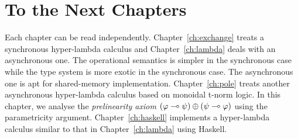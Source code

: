 \section{To the Next Chapters}

Each chapter can be read independently.
Chapter~\ref{ch:exchange} treats a synchronous hyper-lambda calculus and
Chapter~\ref{ch:lambda} deals with an asynchronous one.
The operational semantics is simpler in the synchronous case while
the type system is more exotic in the synchronous case.
The asynchronous one is apt for shared-memory implementation.
Chapter~\ref{ch:pole} treats another asynchronous hyper-lambda calculus
based on monoidal t-norm logic.  In this chapter, we analyse the
\textit{prelinearity
axiom}
$(\varphi\multimap\psi)\oplus(\psi\multimap\varphi)$ using the
parametricity argument.
Chapter~\ref{ch:haskell} implements a hyper-lambda calculus similar to
that in Chapter~\ref{ch:lambda} using Haskell.
